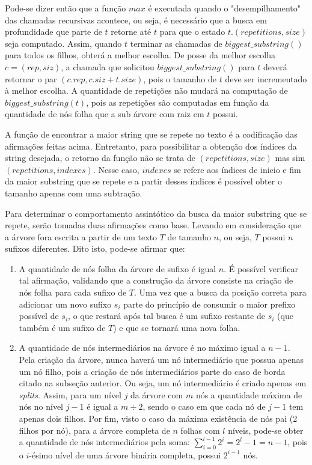 Pode-se dizer então que a função $max$ é executada quando o "desempilhamento"
das chamadas recursivas acontece, ou seja, é necessário que a busca em
profundidade que parte de $t$ retorne até $t$ para que o estado $t.(repetitions,
size)$ seja computado.
Assim, quando $t$ terminar as chamadas de $biggest\_substring()$ para todos os
filhos, obterá a melhor escolha.
De posse da melhor escolha $c = (rep, siz)$, a chamada que solicitou
$biggest\_substring()$ para $t$ deverá retornar o par $(c.rep, c.siz + t.size)$,
pois o tamanho de $t$ deve ser incrementado à melhor escolha.
A quantidade de repetições não mudará na computação de $biggest\_substring(t)$,
pois as repetições são computadas em função da quantidade de nós folha que a
sub árvore com raiz em $t$ possui.

A função de encontrar a maior string que se repete no texto é a codificação
das afirmações feitas acima.
Entretanto, para possibilitar a obtenção dos índices da string desejada, o
retorno da função não se trata de $(repetitions, size)$ mas sim $(repetitions,
indexes)$.
Nesse caso, $indexes$ se refere aos índices de inicio e fim da maior substring
que se repete e a partir desses índices é possível obter o tamanho apenas com
uma subtração.

Para determinar o comportamento assintótico da busca da maior substring que se
repete, serão tomadas duas afirmações como base.
Levando em consideração que a árvore fora escrita a partir de um texto $T$ de
tamanho $n$, ou seja, $T$ possui $n$ sufixos diferentes.
Dito isto, pode-se afirmar que:
\begin{enumerate}
    \item A quantidade de nós folha da árvore de sufixo é igual $n$.
    É possível verificar tal afirmação, validando que a construção da árvore
    consiste na criação de nós folha para cada sufixo de $T$.
    Uma vez que a busca da posição correta para adicionar um novo sufixo $s_i$
    parte do princípio de consumir o maior prefixo possível de $s_i$,
    o que restará após tal busca é um sufixo restante de $s_i$ (que também é um
    sufixo de $T$) e que se tornará uma nova folha.
    \item A quantidade de nós intermediários na árvore é no máximo igual a $n-1$.
    Pela criação da árvore, nunca haverá um nó intermediário que possua apenas um
    nó filho, pois a criação de nós intermediários parte do caso de borda citado
    na subseção anterior.
    Ou seja, um nó intermediário é criado apenas em \textit{splits}.
    Assim, para um nível $j$ da árvore com $m$ nós a quantidade máxima de nós
    no nível $j-1$ é igual a $m \div 2$, sendo o caso em que cada nó de $j-1$
    tem apenas dois filhos.
    Por fim, visto o caso da máxima existência de nós pai (2 filhos por nó),
    para a árvore completa de $n$ folhas com $l$ níveis, pode-se obter a
    quantidade de nós intermediários pela soma: $\sum_{i=0}^{l-1}2^i = 2^l-1 = n-1$,
    pois o $i$-ésimo nível de uma árvore binária completa, possui $2^{i-1}$ nós.
\end{enumerate}

